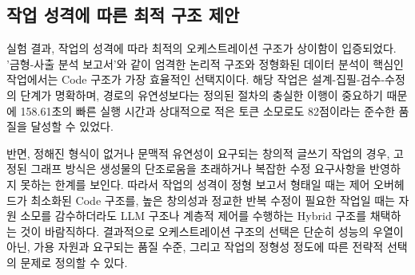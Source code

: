 \subsection{작업 성격에 따른 최적 구조 제안}

실험 결과, 작업의 성격에 따라 최적의 오케스트레이션 구조가 상이함이 입증되었다. '금형-사출 분석 보고서'와 같이 엄격한 논리적 구조와 정형화된 데이터 분석이 핵심인 작업에서는 Code 구조가 가장 효율적인 선택지이다. 해당 작업은 설계-집필-검수-수정의 단계가 명확하며, 경로의 유연성보다는 정의된 절차의 충실한 이행이 중요하기 때문에 158.61초의 빠른 실행 시간과 상대적으로 적은 토큰 소모로도 82점이라는 준수한 품질을 달성할 수 있었다.

반면, 정해진 형식이 없거나 문맥적 유연성이 요구되는 창의적 글쓰기 작업의 경우, 고정된 그래프 방식은 생성물의 단조로움을 초래하거나 복잡한 수정 요구사항을 반영하지 못하는 한계를 보인다. 따라서 작업의 성격이 정형 보고서 형태일 때는 제어 오버헤드가 최소화된 Code 구조를, 높은 창의성과 정교한 반복 수정이 필요한 작업일 때는 자원 소모를 감수하더라도 LLM 구조나 계층적 제어를 수행하는 Hybrid 구조를 채택하는 것이 바람직하다. 결과적으로 오케스트레이션 구조의 선택은 단순히 성능의 우열이 아닌, 가용 자원과 요구되는 품질 수준, 그리고 작업의 정형성 정도에 따른 전략적 선택의 문제로 정의할 수 있다.